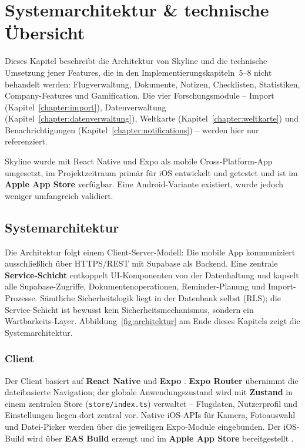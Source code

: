 \chapter{Systemarchitektur \& technische Übersicht}\label{chapter:architektur}

Dieses Kapitel beschreibt die Architektur von Skyline und die technische Umsetzung
jener Features, die in den Implementierungskapiteln~5--8 nicht behandelt werden:
Flugverwaltung, Dokumente, Notizen, Checklisten, Statistiken, Company-Features und
Gamification. Die vier Forschungsmodule -- Import (Kapitel~\ref{chapter:import}),
Datenverwaltung (Kapitel~\ref{chapter:datenverwaltung}), Weltkarte
(Kapitel~\ref{chapter:weltkarte}) und Benachrichtigungen
(Kapitel~\ref{chapter:notifications}) -- werden hier nur referenziert.

Skyline wurde mit React Native und Expo als mobile Cross-Platform-App umgesetzt, im Projektzeitraum primär für iOS entwickelt und getestet und ist im \textbf{Apple App Store} verfügbar. Eine Android-Variante existiert, wurde jedoch weniger umfangreich validiert.

\section{Systemarchitektur}

Die Architektur folgt einem Client-Server-Modell: Die mobile App kommuniziert
ausschließlich über HTTPS/REST mit Supabase als Backend. Eine zentrale
\textbf{Service-Schicht} entkoppelt UI-Komponenten von der Datenhaltung und kapselt
alle Supabase-Zugriffe, Dokumentenoperationen, Reminder-Planung und
Import-Prozesse. Sämtliche Sicherheitslogik liegt in der Datenbank selbst (RLS);
die Service-Schicht ist bewusst kein Sicherheitsmechanismus, sondern ein
Wartbarkeits-Layer. Abbildung~\ref{fig:architektur} am Ende dieses Kapitels zeigt die Systemarchitektur.

\subsection{Client}

Der Client basiert auf \textbf{React Native} und \textbf{Expo} \cite{reactNative,expoDocs}.
\textbf{Expo Router} übernimmt die dateibasierte Navigation; der globale Anwendungszustand wird mit
\textbf{Zustand} in einem zentralen Store (\texttt{store/index.ts}) verwaltet -- Flugdaten,
Nutzerprofil und Einstellungen liegen dort zentral vor. Native iOS-APIs für Kamera,
Fotoauswahl und Datei-Picker werden über die jeweiligen Expo-Module eingebunden. Der
iOS-Build wird über \textbf{EAS Build} erzeugt und im \textbf{Apple App Store} bereitgestellt \cite{easBuild}.

